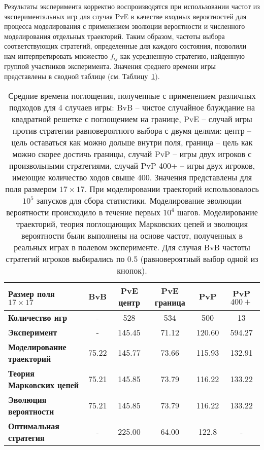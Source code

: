 Результаты эксперимента корректно воспроизводятся при использовании частот из экспериментальных игр для случая PvE в качестве входных вероятностей для процесса моделирования с применением эволюции вероятности и численного моделирования отдельных траекторий. Таким образом, частоты выбора соответствующих стратегий, определенные для каждого состояния, позволили нам интерпретировать множество $f_{ij}$ как усредненную стратегию, найденную группой участников эксперимента. Значения среднего времени игры представлены в сводной таблице (см. Таблицу~\cref{tab:time}).

\begin{table}
    \fontsize{10pt}{10pt}\selectfont
    \begin{tabular}{|l|c|c|c|c|c|}
        \toprule
        Размер поля $17 \times 17$ & \textbf{BvB} & \textbf{PvE центр} & \textbf{PvE граница} & \textbf{PvP} & \textbf{PvP $400+$} \\ 
        \midrule
        \textbf{Количество игр} & -     & 528    & 534   & 500    & 13     \\
        \midrule
        \textbf{Эксперимент}  & -     & 145.45 & 71.12 & 120.60 & 594.27 \\ 
        \textbf{Моделирование траекторий}  & 75.22 & 145.77 & 73.66 & 115.93 & 132.91 \\
        \textbf{Теория Марковских цепей}  & 75.21 & 145.85 & 73.79 & 116.22 & 133.22 \\
        \textbf{Эволюция вероятности}   & 75.21 & 145.85 & 73.79 & 116.22 & 133.22 \\ 
        \textbf{Оптимальная стратегия}     & -     & 225.00 & 64.00 & 122.8  & -      \\ 
        \bottomrule
    \end{tabular}
    \caption{
        Средние времена поглощения, полученные с применением различных подходов для 4 случаев игры: BvB -- чистое случайное блуждание на квадратной решетке с поглощением на границе, PvE -- случай игры против стратегии равновероятного выбора с двумя целями: центр -- цель оставаться как можно дольше внутри поля, граница -- цель как можно скорее достичь границы, случай PvP -- игры двух игроков с произвольными стратегиями, случай PvP 400+ -- игры двух игроков, имеющие количество ходов свыше 400. Значения представлены для поля размером $17 \times 17$. При моделировании траекторий использовалось $10^5$ запусков для сбора статистики. Моделирование эволюции вероятности происходило в течение первых $10^4$ шагов. Моделирование траекторий, теория поглощающих Марковских цепей и эволюция вероятности были выполнены на основе частот, полученных в реальных играх в полевом эксперименте. Для случая BvB частоты стратегий игроков выбирались по 0.5 (равновероятный выбор одной из кнопок).
    }
    \label{tab:time}
\end{table}

